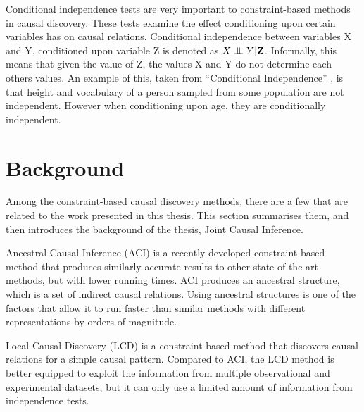 \documentclass[a4paper,pdf]{article}
\newcommand{\CI}{\mathrel{\perp\mspace{-10mu}\perp}}
\newcommand\B[1]{\textbf{#1}} %
\begin{document}
Conditional independence tests are very important to constraint-based methods in causal discovery. These tests examine the effect conditioning upon certain variables has on causal relations.  Conditional independence between variables X and Y, conditioned upon variable Z is denoted as $X \CI Y | \B{Z}$. Informally, this means that given the value of Z, the values X and Y do not determine each others values. An example of this, taken from ``Conditional Independence'' \cite{wiki:CI}, is that height and vocabulary of a person sampled from some population are not independent. However when conditioning upon age, they are conditionally independent.%

	
\section{Background} 
Among the constraint-based causal discovery methods, there are a few that are related to the work presented in this thesis. This section summarises them, and then introduces the background of the thesis, Joint Causal Inference.

Ancestral Causal Inference (ACI) \cite{aci} is a recently developed constraint-based method that produces similarly accurate results to other state of the art methods, but with lower running times. ACI produces an ancestral structure, which is a set of indirect causal relations. 
Using ancestral structures is one of the factors that allow it to run faster than similar methods with different representations by orders of magnitude. 

Local Causal Discovery (LCD) \cite{cooper1999causal} is a constraint-based method that discovers causal relations for a simple causal pattern. Compared to ACI, the LCD method is better equipped to exploit the information from multiple observational and experimental datasets, but it can only use a limited amount of information from independence tests.
\end{document}
